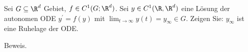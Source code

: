 \begin{exercise}
Sei $G \subseteq \R^d$ Gebiet, $f \in C^1(G;\R^d)$. Sei $y \in C^1(\R,\R^d)$
eine Lösung der autonomen ODE $y^{\prime} = f(y)$ mit
$\lim_{t \rightarrow \infty} y(t) = y_{\infty} \in G$.
Zeigen Sie: $y_{\infty}$ ist eine Ruhelage der ODE.
\end{exercise}
\begin{solution}
    Beweis.
\end{solution}
